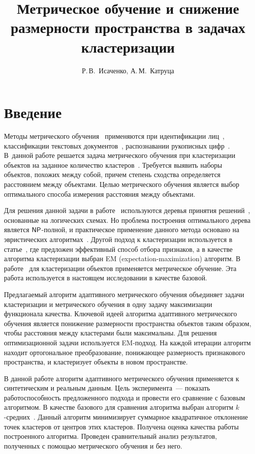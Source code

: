 \documentclass[12pt,twoside]{article}
\title
    [Метрическое обучение]
    {Метрическое обучение и снижение размерности пространства в задачах кластеризации}
\author
    [Р.\,В.~Исаченко]
    {Р.\,В.~Исаченко, А.\,М.~Катруца}
\begin{document}
\maketitle
\section{Введение}
Методы метрического обучения~\cite{yang2006distance, bellet2013survey}
применяются при идентификации лиц~\cite{guillaumin2009you}, классификации
текстовых документов~\cite{yang2006efficient}, распознавании рукописных
цифр~\cite{globerson2005metric}.
В~данной работе решается задача метрического обучения при кластеризации объектов на заданное количество кластеров~\cite{xing2003distance}.
Требуется выявить наборы объектов, похожих между собой, причем степень сходства определяется расстоянием между объектами.
Целью метрического обуче\-ния является выбор оптимального способа измерения расстояния между объектами.

Для решения данной задачи в работе~\cite{geurts2001pattern} используются деревья принятия решений~\cite{friedl1997decision}, основанные на логических схемах.
Но проблема построения оптимального дерева является $\NP$-полной, и практическое применение данного метода основано на эвристических алгоритмах~\cite{hyafil1976constructing}.
Другой подход к кластеризации используется в статье~\cite{dy2004feature}, где предложен эффективный  способ отбора признаков, а в качестве алгоритма кластеризации выбран
EM (expectation-maximization) алгоритм.
В работе~\cite{ye2007adaptive} для кластеризации объектов применяется
метрическое обуче\-ние.
Эта работа используется в настоящем исследовании в качестве базовой.

Предлагаемый алгоритм адаптивного метрического обучения объединяет задачи
клас\-те\-ри\-за\-ции и метрического обучения в одну задачу максимизации функционала качества.
Ключевой идеей алгоритма адаптивного метрического обучения является понижение размерности пространства объектов таким образом, чтобы расстояния между кластерами были максимальны.
Для решения оптимизационной задачи используется EM-подход.
На каждой итерации алгоритм находит ортогональное преобразование, понижающее размерность признакового пространства, и кластеризует объекты в новом пространстве.

В данной работе алгоритм адаптивного метрического обучения применяется к синтетическим и реальным данным.
Цель эксперимента~--- показать работоспособность предложенного подхода и провести его сравнение с базовым алгоритмом.
В качестве базового для сравнения алгоритма выбран алгоритм $k$-средних~\cite{macqueen1967some}.
Данный алгоритм минимизирует суммарное квадратичное отклонение точек кластеров от центров этих кластеров.
Получена оценка качества работы построенного алгоритма.
Проведен сравнительный анализ результатов, полученных с помощью метрического обучения и без него.
\end{document}
